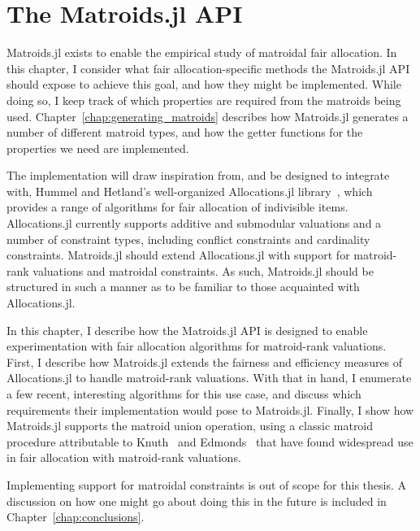 \chapter{The Matroids.jl API}
\label{chap:matroids.jl}
Matroids.jl exists to enable the empirical study of matroidal fair allocation. In this chapter, I consider what fair allocation-specific methods the Matroids.jl API should expose to achieve this goal, and how they might be implemented. While doing so, I keep track of which properties are required from the matroids being used. Chapter~\ref{chap:generating_matroids} describes how Matroids.jl generates a number of different matroid types, and how the getter functions for the properties we need are implemented.

The implementation will draw inspiration from, and be designed to integrate with, Hummel and Hetland's well-organized Allocations.jl library~\cite{Hetland_Allocations_jl_2022}, which provides a range of algorithms for fair allocation of indivisible items. Allocations.jl currently supports additive and submodular valuations and a number of constraint types, including conflict constraints and cardinality constraints. Matroids.jl should extend Allocations.jl with support for matroid-rank valuations and matroidal constraints. As such, Matroids.jl should be structured in such a manner as to be familiar to those acquainted with Allocations.jl.

In this chapter, I describe how the Matroids.jl API is designed to enable experimentation with fair allocation algorithms for matroid-rank valuations. First, I describe how Matroids.jl extends the fairness and efficiency measures of Allocations.jl to handle matroid-rank valuations. With that in hand, I enumerate a few recent, interesting algorithms for this use case, and discuss which requirements their implementation would pose to Matroids.jl. Finally, I show how Matroids.jl supports the matroid union operation, using a classic matroid procedure attributable to Knuth~\cite{knuth1973matroidpartitioning} and Edmonds~\cite{Edmonds2009} that have found widespread use in fair allocation with matroid-rank valuations.

Implementing support for matroidal constraints is out of scope for this thesis. A discussion on how one might go about doing this in the future is included in Chapter~\ref{chap:conclusions}.

